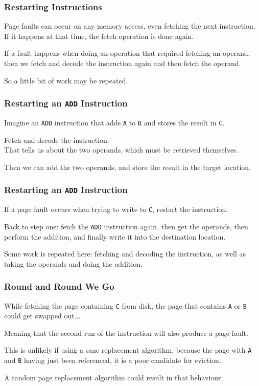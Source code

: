 \begin{frame}
\frametitle{Restarting Instructions}

Page faults can occur on any memory access, even fetching the next instruction.\\
\quad If it happens at that time, the fetch operation is done again. 

If a fault happens when doing an operation that required fetching an operand, then we fetch and decode the instruction again and then fetch the operand. 

So a little bit of work may be repeated.

\end{frame}



\begin{frame}
\frametitle{Restarting an \texttt{ADD} Instruction}

Imagine an \texttt{ADD} instruction that adds \texttt{A} to \texttt{B} and stores the result in \texttt{C}. 

Fetch and decode the instruction.\\
\quad That tells us about the two operands, which must be retrieved themselves. 

Then we can add the two operands, and store the result in the target location.

\end{frame}

\begin{frame}
\frametitle{Restarting an \texttt{ADD} Instruction}

If a page fault occurs when trying to write to \texttt{C}, restart the instruction. 

Back to step one: fetch the \texttt{ADD} instruction again, then get the operands, then perform the addition, and finally write it into the destination location.

Some work is repeated here: fetching and decoding the instruction, as well as taking the operands and doing the addition. 

\end{frame}

\begin{frame}
\frametitle{Round and Round We Go}

While fetching the page containing \texttt{C} from disk, the page that contains \texttt{A} or \texttt{B} could get swapped out...

Meaning that the second run of the instruction will also produce a page fault. 

This is unlikely if using a sane replacement algorithm, because the page with \texttt{A} and \texttt{B} having just been referenced, it is a poor candidate for eviction. 

A random page replacement algorithm could result in that behaviour.

\end{frame}

